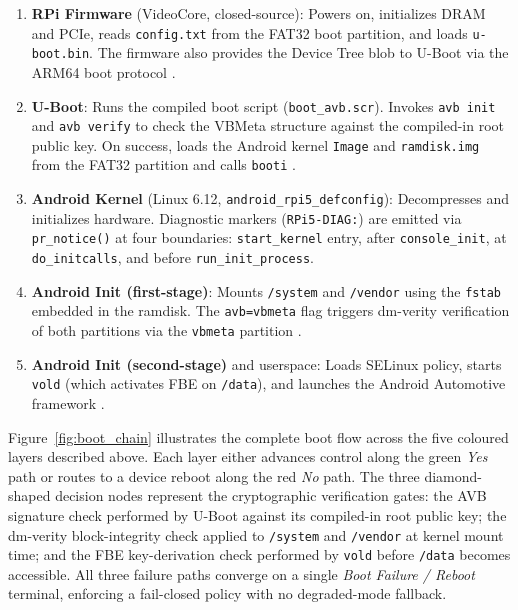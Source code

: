 \begin{enumerate}
    \item \textbf{RPi Firmware} (VideoCore, closed-source): Powers on, initializes DRAM and PCIe, reads \texttt{config.txt} from the FAT32 boot partition, and loads \texttt{u-boot.bin}. The firmware also provides the Device Tree blob to U-Boot via the ARM64 boot protocol \cite{rpi_hardware_docs}.

    \item \textbf{U-Boot}: Runs the compiled boot script (\texttt{boot\_avb.scr}). Invokes \texttt{avb init} and \texttt{avb verify} to check the VBMeta structure against the compiled-in root public key. On success, loads the Android kernel \texttt{Image} and \texttt{ramdisk.img} from the FAT32 partition and calls \texttt{booti} \cite{uboot_build_gcc, uboot_rpi5_forum}.

    \item \textbf{Android Kernel} (Linux 6.12, \texttt{android\_rpi5\_defconfig}): Decompresses and initializes hardware. Diagnostic markers (\texttt{RPi5-DIAG:}) are emitted via \texttt{pr\_notice()} at four boundaries: \texttt{start\_kernel} entry, after \texttt{console\_init}, at \texttt{do\_initcalls}, and before \texttt{run\_init\_process}.

    \item \textbf{Android Init (first-stage)}: Mounts \texttt{/system} and \texttt{/vendor} using the \texttt{fstab} embedded in the ramdisk. The \texttt{avb=vbmeta} flag triggers dm-verity verification of both partitions via the \texttt{vbmeta} partition \cite{android_dm_verity}.

    \item \textbf{Android Init (second-stage)} and userspace: Loads SELinux policy, starts \texttt{vold} (which activates FBE on \texttt{/data}), and launches the Android Automotive framework \cite{android_fbe}.
\end{enumerate}

Figure~\ref{fig:boot_chain} illustrates the complete boot flow across the five coloured layers described above. Each layer either advances control along the green \textit{Yes} path or routes to a device reboot along the red \textit{No} path. The three diamond-shaped decision nodes represent the cryptographic verification gates: the AVB signature check performed by U-Boot against its compiled-in root public key; the dm-verity block-integrity check applied to \texttt{/system} and \texttt{/vendor} at kernel mount time; and the FBE key-derivation check performed by \texttt{vold} before \texttt{/data} becomes accessible. All three failure paths converge on a single \textit{Boot Failure / Reboot} terminal, enforcing a fail-closed policy with no degraded-mode fallback.

